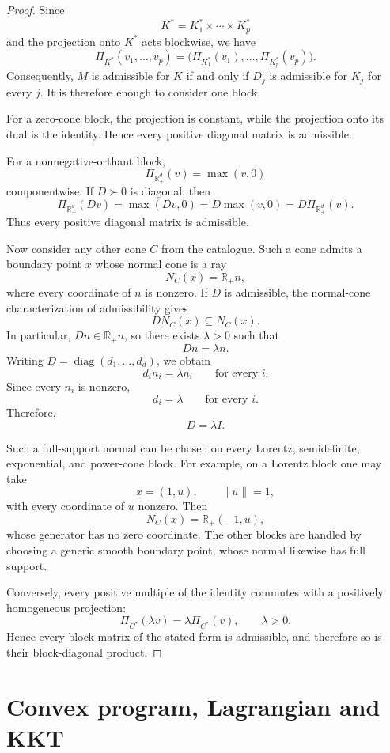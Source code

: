 \documentclass[a4paper,11pt]{book}
\theoremstyle{plain}
\theoremstyle{definition}
\theoremstyle{remark}
\numberwithin{equation}{chapter}
\numberwithin{algorithm}{chapter}
\newcommand{\R}{\mathbb{R}}
\newcommand{\diag}{\operatorname{diag}}
\begin{document}
	\begin{proof}
		Since
		\[
		K^*=K_1^*\times\cdots\times K_p^*
		\]
		and the projection onto \(K^*\) acts blockwise, we have
		\[
		\Pi_{K^*}(v_1,\ldots,v_p)
		=
		\bigl(\Pi_{K_1^*}(v_1),\ldots,\Pi_{K_p^*}(v_p)\bigr).
		\]
		Consequently, \(M\) is admissible for \(K\) if and only if \(D_j\) is
		admissible for \(K_j\) for every \(j\). It is therefore enough to consider
		one block.
		
		For a zero-cone block, the projection is constant, while the projection
		onto its dual is the identity. Hence every positive diagonal matrix is
		admissible.
		
		For a nonnegative-orthant block,
		\[
		\Pi_{\R_+^d}(v)=\max(v,0)
		\]
		componentwise. If \(D\succ0\) is diagonal, then
		\[
		\Pi_{\R_+^d}(Dv)
		=
		\max(Dv,0)
		=
		D\max(v,0)
		=
		D\Pi_{\R_+^d}(v).
		\]
		Thus every positive diagonal matrix is admissible.
		
		Now consider any other cone \(C\) from the catalogue. Such a cone admits a
		boundary point \(x\) whose normal cone is a ray
		\[
		N_C(x)=\R_+n,
		\]
		where every coordinate of \(n\) is nonzero. If \(D\) is admissible, the
		normal-cone characterization of admissibility gives
		\[
		DN_C(x)\subseteq N_C(x).
		\]
		In particular, \(Dn\in\R_+n\), so there exists \(\lambda>0\) such that
		\[
		Dn=\lambda n.
		\]
		Writing \(D=\diag(d_1,\ldots,d_d)\), we obtain
		\[
		d_i n_i=\lambda n_i
		\qquad\text{for every }i.
		\]
		Since every \(n_i\) is nonzero,
		\[
		d_i=\lambda
		\qquad\text{for every }i.
		\]
		Therefore,
		\[
		D=\lambda I.
		\]
		
		Such a full-support normal can be chosen on every Lorentz, semidefinite,
		exponential, and power-cone block. For example, on a Lorentz block one may
		take
		\[
		x=(1,u),
		\qquad
		\|u\|=1,
		\]
		with every coordinate of \(u\) nonzero. Then
		\[
		N_C(x)=\R_+(-1,u),
		\]
		whose generator has no zero coordinate. The other blocks are handled by
		choosing a generic smooth boundary point, whose normal likewise has full
		support.
		
		Conversely, every positive multiple of the identity commutes with a
		positively homogeneous projection:
		\[
		\Pi_{C^*}(\lambda v)
		=
		\lambda\Pi_{C^*}(v),
		\qquad \lambda>0.
		\]
		Hence every block matrix of the stated form is admissible, and therefore so
		is their block-diagonal product.
	\end{proof}
	
	
	\chapter{Convex program, Lagrangian and KKT}
	
\end{document}
